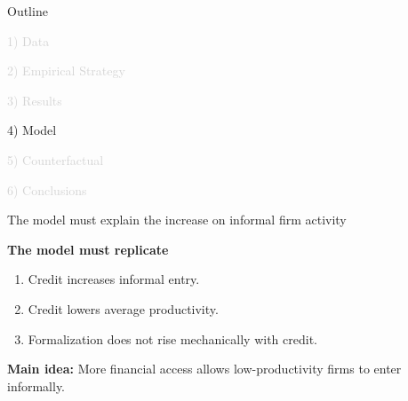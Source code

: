\documentclass[aspectratio=169]{beamer}
\begin{document}
\begin{frame}[noframenumbering]{Outline}

\Large

\textcolor{lightgray}{1) Data}

\vspace{5mm}

\textcolor{lightgray}{2) Empirical Strategy}

\vspace{5mm}

\textcolor{lightgray}{3) Results}

\vspace{5mm}

4) Model

\vspace{5mm}

\textcolor{lightgray}{5) Counterfactual}

\vspace{5mm}

\textcolor{lightgray}{6) Conclusions}

\end{frame}


\begin{frame}{The model must explain the increase on informal firm activity}

\textbf{The model must replicate}

\begin{enumerate}
    \item Credit increases informal entry.
    \item Credit lowers average productivity.
    \item Formalization does not rise mechanically with credit.
\end{enumerate}

\vspace{6mm}

\large
\textbf{Main idea:} More financial access allows low-productivity firms to enter informally.

\end{frame}

\end{document}
